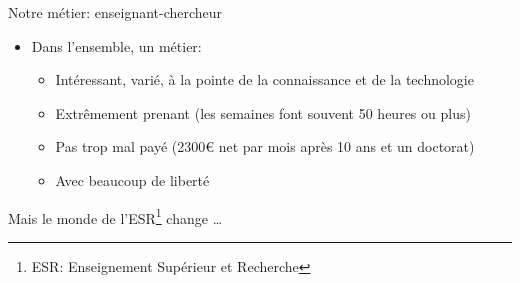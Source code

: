 \documentclass[10pt,final,usepdftitle=false]{beamer}
\begin{document}
\begin{frame}{Notre métier: enseignant-chercheur}
\begin{itemize}
\item Dans l'ensemble, un métier:
\begin{itemize}
\item Intéressant, varié, à la pointe de la connaissance et de la technologie
\item Extrêmement prenant (les semaines font souvent 50 heures ou plus)
\item Pas trop mal payé (2300\euro{} net par mois après 10 ans et un doctorat)
\item Avec beaucoup de liberté
\end{itemize}
\end{itemize}

\pause \bigskip %

\centerline{\large Mais le monde de l'ESR\footnote{ESR: Enseignement Supérieur
    et Recherche} change \ldots}

\end{frame}
\end{document}
